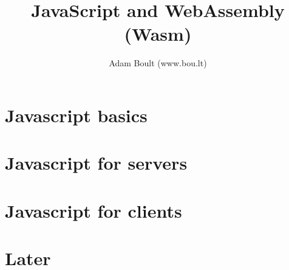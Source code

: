 \documentclass[oneside]{book}
\begin{document}
\author{Adam Boult (www.bou.lt)}
\title{JavaScript and WebAssembly (Wasm)}
\maketitle

\setcounter{tocdepth}{0}
\tableofcontents



\part{Javascript basics}







\part{Javascript for servers}







\part{Javascript for clients}




\part{Later}


\end{document}

